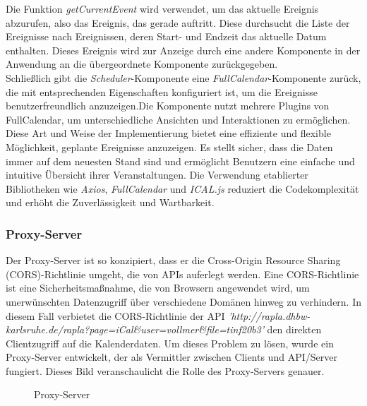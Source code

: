 Die Funktion \emph{getCurrentEvent} wird verwendet, um das aktuelle Ereignis abzurufen, also das Ereignis, das gerade auftritt. Diese durchsucht die Liste der Ereignisse nach Ereignissen, deren Start- und Endzeit das aktuelle Datum enthalten. Dieses Ereignis wird zur Anzeige durch eine andere Komponente in der Anwendung an die übergeordnete Komponente zurückgegeben.\\
Schließlich gibt die \emph{Scheduler}-Komponente eine \emph{FullCalendar}-Komponente zurück, die mit  entsprechenden Eigenschaften konfiguriert ist, um die Ereignisse benutzerfreundlich anzuzeigen.Die Komponente nutzt mehrere Plugins von FullCalendar, um unterschiedliche Ansichten und Interaktionen zu ermöglichen.\\
Diese Art und Weise der Implementierung bietet eine effiziente und flexible Möglichkeit, geplante Ereignisse anzuzeigen. Es stellt sicher, dass die Daten immer auf dem neuesten Stand sind und ermöglicht Benutzern eine einfache und intuitive Übersicht ihrer Veranstaltungen. Die Verwendung etablierter Bibliotheken wie \emph{Axios}, \emph{FullCalendar} und \emph{ICAL.js} reduziert die Codekomplexität und erhöht die Zuverlässigkeit und Wartbarkeit.
\subsubsection{Proxy-Server}

Der Proxy-Server ist so konzipiert, dass er die Cross-Origin Resource Sharing (CORS)-Richtlinie umgeht, die von APIs auferlegt werden. Eine CORS-Richtlinie ist eine Sicherheitsmaßnahme, die von Browsern angewendet wird, um  unerwünschten Datenzugriff über verschiedene Domänen hinweg zu verhindern. In diesem Fall verbietet die CORS-Richtlinie der API \emph{'http://rapla.dhbw-karlsruhe.de/rapla?page=iCal\&user=vollmer\&file=tinf20b3'} den direkten Clientzugriff auf die Kalenderdaten. Um dieses Problem zu lösen, wurde ein Proxy-Server entwickelt, der als Vermittler zwischen Clients und API/Server fungiert. Dieses Bild veranschaulicht die Rolle des Proxy-Servers genauer.
\begin{figure}[htbp]
	\centering
	\caption{Proxy-Server}
\end{figure}

